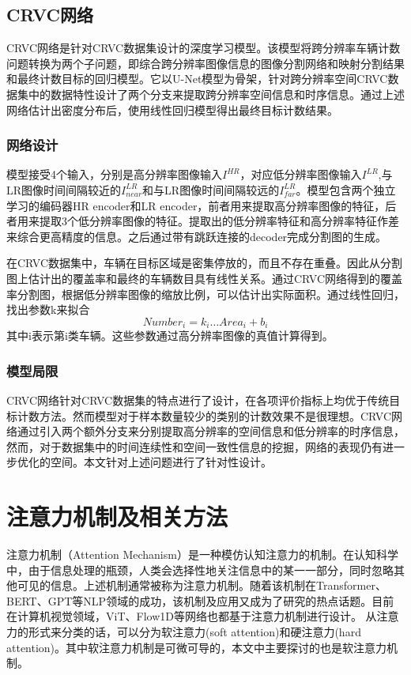 \subsection{CRVC网络}
CRVC网络是针对CRVC数据集设计的深度学习模型。该模型将跨分辨率车辆计数问题转换为两个子问题，即综合跨分辨率图像信息的图像分割网络和映射分割结果和最终计数目标的回归模型。它以U-Net模型为骨架，针对跨分辨率空间CRVC数据集中的数据特性设计了两个分支来提取跨分辨率空间信息和时序信息。通过上述网络估计出密度分布后，使用线性回归模型得出最终目标计数结果。

\subsubsection{网络设计}

模型接受4个输入，分别是高分辨率图像输入$I^{HR}$，对应低分辨率图像输入$I^{LR}$,与LR图像时间间隔较近的$I^{LR}_{near}$和与LR图像时间间隔较远的$I^{LR}_{far}$。模型包含两个独立学习的编码器HR encoder和LR encoder，前者用来提取高分辨率图像的特征，后者用来提取3个低分辨率图像的特征。提取出的低分辨率特征和高分辨率特征作差来综合更高精度的信息。之后通过带有跳跃连接的decoder完成分割图的生成。


在CRVC数据集中，车辆在目标区域是密集停放的，而且不存在重叠。因此从分割图上估计出的覆盖率和最终的车辆数目具有线性关系。通过CRVC网络得到的覆盖率分割图，根据低分辨率图像的缩放比例，可以估计出实际面积。通过线性回归，找出参数k来拟合
\begin{equation}
    Number_i=k_i\dots Area_i+b_i
\end{equation}
其中i表示第i类车辆。这些参数通过高分辨率图像的真值计算得到。

\subsubsection{模型局限}
CRVC网络针对CRVC数据集的特点进行了设计，在各项评价指标上均优于传统目标计数方法。然而模型对于样本数量较少的类别的计数效果不是很理想。CRVC网络通过引入两个额外分支来分别提取高分辨率的空间信息和低分辨率的时序信息，然而，对于数据集中的时间连续性和空间一致性信息的挖掘，网络的表现仍有进一步优化的空间。本文针对上述问题进行了针对性设计。



\section{注意力机制及相关方法}
注意力机制（Attention Mechanism）\cite{vaswani2017attention}是一种模仿认知注意力的机制。在认知科学中，由于信息处理的瓶颈，人类会选择性地关注信息中的某一一部分，同时忽略其他可见的信息。上述机制通常被称为注意力机制。随着该机制在Transformer\cite{vaswani2017attention}、BERT\cite{devlin-etal-2019-bert}、GPT\cite{2023GenerativePretrainedTransformerComprehensiveReviewEnablingTechnologiesPotentialApplicationsEmergingChallengesFutureDirections}等NLP领域的成功，该机制及应用又成为了研究的热点话题。目前在计算机视觉领域，ViT\cite{dosovitskiy2021an}、Flow1D\cite{2022ComparisonPoolingMethodsConvolutionalNeuralNetworks}等网络也都基于注意力机制进行设计。
从注意力的形式来分类的话，可以分为软注意力(soft attention)和硬注意力(hard attention)。其中软注意力机制是可微可导的，本文中主要探讨的也是软注意力机制。

